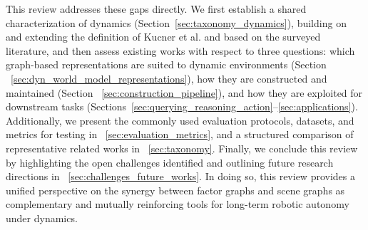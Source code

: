 This review addresses these gaps directly.
We first establish a shared characterization of dynamics (Section~\ref{sec:taxonomy_dynamics}), building on and extending the definition of Kucner et al. \cite{kucner_survey_2023} and based on the surveyed literature, and then assess existing works with respect to three questions: which graph-based representations are suited to dynamic environments (Section ~\ref{sec:dyn_world_model_representations}), how they are constructed and maintained (Section ~\ref{sec:construction_pipeline}), and how they are exploited for downstream tasks (Sections~\ref{sec:querying_reasoning_action}--\ref{sec:applications}). 
Additionally, we present the commonly used evaluation protocols, datasets, and metrics for testing in ~\ref{sec:evaluation_metrics}, and a  structured comparison of  representative related works in ~\ref{sec:taxonomy}. Finally, we conclude this review by highlighting the open challenges identified and outlining future research directions in ~\ref{sec:challenges_future_works}. 
In doing so, this review provides a unified perspective on the synergy between factor graphs and scene graphs as complementary and mutually reinforcing tools for long-term robotic autonomy under dynamics.


